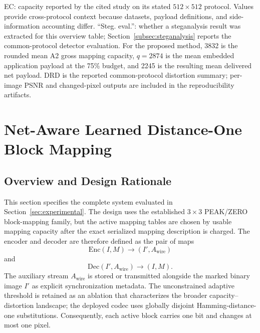 \documentclass[a4paper,fleqn]{cas-dc}
\newcommand{\RevisionAddEnd}{\endgroup}
\newcommand{\RevisionAddEnd}{\endgroup}
\begin{document}
\begin{table}[t]
{\footnotesize\RaggedRight EC: capacity reported by the cited study on its stated
$512\times512$ protocol. Values provide cross-protocol context because
datasets, payload definitions, and side-information accounting differ.
``Steg. eval.'': whether a steganalysis result was extracted for this overview
table; Section~\ref{subsec:steganalysis} reports the common-protocol detector
evaluation. For the proposed method, 3832 is the rounded mean A2 gross mapping
capacity, $q=2874$ is the mean embedded application payload at the 75\% budget,
and 2245 is the resulting mean delivered net payload. DRD is the reported
common-protocol distortion summary; per-image PSNR and changed-pixel outputs are
included in the reproducibility artifacts.\par}
\RevisionAddEnd
\end{table}

\section{Net-Aware Learned Distance-One Block Mapping}
\label{sec:proposedmethod}

\subsection{Overview and Design Rationale}

This section specifies the complete system evaluated in
Section~\ref{sec:experimental}. The design uses the established
$3\times3$ PEAK/ZERO block-mapping family, but the active mapping tables are
chosen by usable mapping capacity after the exact serialized mapping description is
charged. The encoder and decoder are therefore defined as the pair of maps
\begin{equation}
\mathrm{Enc}(I,M)\rightarrow(I',A_{\mathrm{wire}})
\label{eq:encoder-contract}
\end{equation}
and
\begin{equation}
\mathrm{Dec}(I',A_{\mathrm{wire}})\rightarrow(I,M).
\label{eq:decoder-contract}
\end{equation}
The auxiliary stream $A_{\mathrm{wire}}$ is stored or transmitted alongside the
marked binary image $I'$ as explicit synchronization metadata. The
unconstrained adaptive threshold is retained as an ablation that characterizes
the broader capacity--distortion landscape; the deployed codec uses globally
disjoint Hamming-distance-one substitutions. Consequently, each active block
carries one bit and changes at most one pixel.
\end{document}
